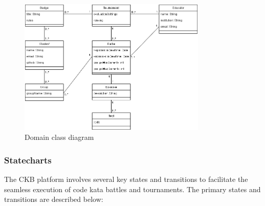 \begin{figure}[h!]
  \centering
  \includegraphics[width=0.8\textwidth]{Images/ClassDiagramRASD.png}
  \caption{Domain class diagram}
  \label{fig:ClassDiagram}
\end{figure}

\subsubsection{Statecharts}


The CKB platform involves several key states and transitions to facilitate the seamless execution of code kata battles and tournaments. The primary states and transitions are described below:

